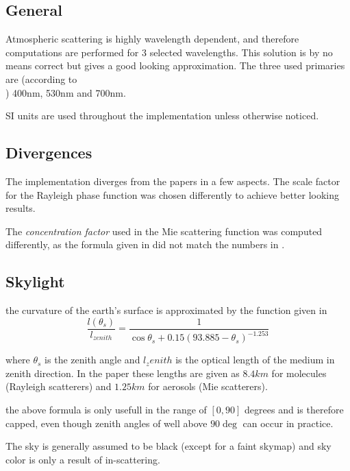 \documentclass[12pt,a4paper]{scrartcl}
\begin{document}
\subsection{General}
Atmospheric scattering is highly wavelength dependent, and therefore computations are performed for 3 selected wavelengths. This solution is by no means correct but gives a good looking approximation. The three used primaries are (according to\\ \cite{03ATI-LightScattering}) 400nm, 530nm and 700nm. 

SI units are used throughout the implementation unless otherwise noticed.

\subsection{Divergences}
The implementation diverges from the papers in a few aspects. The scale factor for the Rayleigh phase function was chosen differently to achieve better looking results. 

The \emph{concentration factor} used in the Mie scattering function was computed differently, as the formula given in \cite{PreethamShirleySmits99A-practical-analytic} did not match the numbers in \cite{03ATI-LightScattering}.



\subsection{Skylight}
the curvature of the earth's surface is approximated by the function given in\\ \cite{03ATI-LightScattering}
\begin{equation}
\frac{l(\theta_s)}{l_{zenith}} = \frac{1}{\cos \theta_s + 0.15(93.885 - \theta_s)^{-1.253}}
\end{equation}

where $\theta_s$ is the zenith angle and $l_zenith$ is the optical length of the medium in zenith direction. In the paper these lengths are given as $8.4km$ for molecules (Rayleigh scatterers) and $1.25km$ for aerosols (Mie scatterers).

the above formula is only usefull in the range of $[0, 90]$ degrees and is therefore capped, even though zenith angles of well above $90\deg$ can occur in practice.

The sky is generally assumed to be black (except for a faint skymap) and sky color is only a result of in-scattering. 
\end{document}
